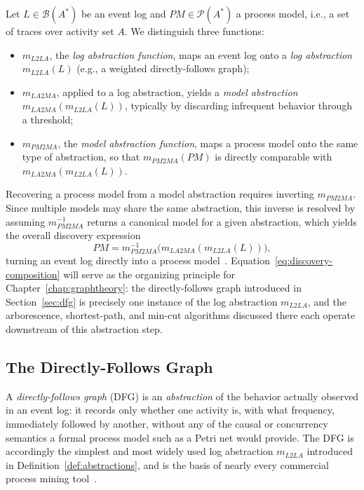 \begin{definition}
	\label{def:abstractions}
	Let $L \in \mathcal{B}(A^{*})$ be an event log and
	$PM \in \mathcal{P}(A^{*})$ a process model, i.e., a set of traces over
	activity set $A$. We distinguish three functions:
	\begin{itemize}[leftmargin=*]
		\item $m_{L2LA}$, the \emph{log abstraction function}, maps an event log
		onto a \emph{log abstraction} $m_{L2LA}(L)$ (e.g., a weighted
		directly-follows graph);
		\item $m_{LA2MA}$, applied to a log abstraction, yields a
		\emph{model abstraction} $m_{LA2MA}(m_{L2LA}(L))$, typically by
		discarding infrequent behavior through a threshold;
		\item $m_{PM2MA}$, the \emph{model abstraction function}, maps a process
		model onto the same type of abstraction, so that $m_{PM2MA}(PM)$ is
		directly comparable with $m_{LA2MA}(m_{L2LA}(L))$.
	\end{itemize}
\end{definition}

Recovering a process model from a model abstraction requires inverting
$m_{PM2MA}$. Since multiple models may share the same abstraction, this
inverse is resolved by assuming $m_{PM2MA}^{-1}$ returns a canonical model
for a given abstraction, which yields the overall discovery expression
\begin{equation}
	\label{eq:discovery-composition}
	PM = m_{PM2MA}^{-1}\bigl(m_{LA2MA}(m_{L2LA}(L))\bigr),
\end{equation}
turning an event log directly into a process model~\cite{aalst2018reconstruction}.
Equation~\eqref{eq:discovery-composition} will serve as the organizing
principle for Chapter~\ref{chap:graphtheory}: the directly-follows graph
introduced in Section~\ref{sec:dfg} is precisely one instance of the log
abstraction $m_{L2LA}$, and the arborescence, shortest-path, and min-cut
algorithms discussed there each operate downstream of this abstraction step.
	
\subsection{The Directly-Follows Graph}
\label{subsec:dfg-formal}

A \emph{directly-follows graph} (DFG) is an \emph{abstraction} of the
behavior actually observed in an event log: it records only whether one
activity is, with what frequency, immediately followed by another, without
any of the causal or concurrency semantics a formal process model such as a
Petri net would provide. The DFG is accordingly the simplest and most
widely used log abstraction $m_{L2LA}$ introduced in
Definition~\ref{def:abstractions}, and is the basis of nearly every
commercial process mining tool~\cite{aalst2018reconstruction}.

